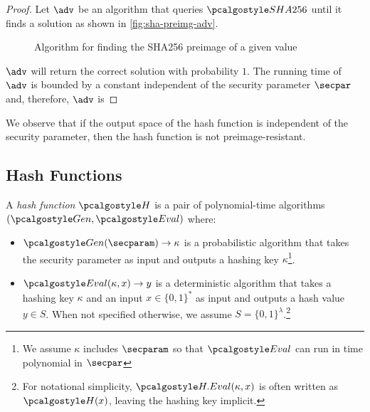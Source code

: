 \begin{proof}
  Let $\adv$ be an algorithm that queries $\algo{SHA256}$ until it finds a solution as shown in \autoref{fig:sha-preimg-adv}.
  \begin{figure}[tbhp]
  \begin{center}
    \begin{tcolorbox}[width=5cm]
      \begin{pchstack}[center]
      \end{pchstack}
    \end{tcolorbox}
  \end{center}
  \caption{Algorithm for finding the SHA256 preimage of a given value \label{fig:sha-preimg-adv}}
  \end{figure}
  $\adv$ will return the correct solution with probability $1$.
  The running time of $\adv$ is bounded by a constant independent of the security parameter $\secpar$ and, therefore, $\adv$ is \ppt
\end{proof}


We observe that if the output space of the hash function is independent of the security parameter, then the hash function is not preimage-resistant.

\subsection{Hash Functions}

\begin{definition}
  A \emph{hash function} $\algo{H}$ is a pair of polynomial-time algorithms $(\algo{Gen}, \algo{Eval})$ where:
  \begin{itemize}
  \item $\algo{Gen}(\secparam) \rightarrow \kappa$ is a probabilistic algorithm that takes the security parameter as input and outputs a hashing key $\kappa$\footnote{We assume $\kappa$ includes $\secparam$ so that $\algo{Eval}$ can run in time polynomial in $\secpar$}.
  \item $\algo{Eval}(\kappa, x) \rightarrow y$ is a deterministic algorithm that takes a hashing key $\kappa$ and an input $x \in \{0,1\}^*$ as input and outputs a hash value $y \in S$. When not specified otherwise, we assume $S = \{0,1\}^{\lambda}$.\footnote{For notational simplicity, $\algo{H.Eval}(\kappa, x)$ is often written as $\algo{H}(x)$, leaving the hashing key implicit.}
  \end{itemize}
\end{definition}

